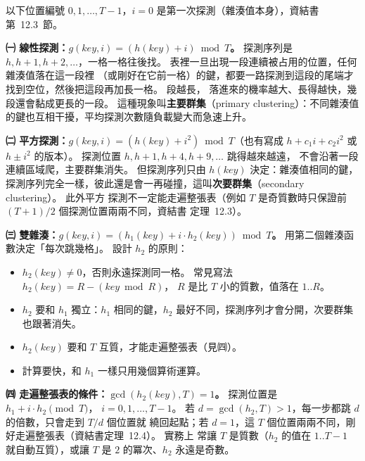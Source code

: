 \begin{pastsoln}
以下位置編號 $0, 1, \dots, T-1$，$i = 0$ 是第一次探測（雜湊值本身），資結書第~12.3~節。

\textbf{㈠ 線性探測：$g(\mathit{key}, i) = (h(\mathit{key}) + i) \bmod T$。} 探測序列是
$h, h+1, h+2, \dots$，一格一格往後找。 表裡一旦出現一段連續被占用的位置，任何雜湊值落在這一段裡
（或剛好在它前一格）的鍵，都要一路探測到這段的尾端才找到空位，然後把這段再加長一格。 段越長，
落進來的機率越大、長得越快，幾段還會黏成更長的一段。 這種現象叫\textbf{主要群集}（primary
clustering）：不同雜湊值的鍵也互相干擾，平均探測次數隨負載變大而急速上升。

\textbf{㈡ 平方探測：$g(\mathit{key}, i) = (h(\mathit{key}) + i^2) \bmod T$}（也有寫成
$h + c_1 i + c_2 i^2$ 或 $h \pm i^2$ 的版本）。 探測位置 $h, h+1, h+4, h+9, \dots$ 跳得越來越遠，
不會沿著一段連續區域爬，主要群集消失。 但探測序列只由 $h(\mathit{key})$ 決定：雜湊值相同的鍵，
探測序列完全一樣，彼此還是會一再碰撞，這叫\textbf{次要群集}（secondary clustering）。 此外平方
探測不一定能走遍整張表（例如 $T$ 是奇質數時只保證前 $(T+1)/2$ 個探測位置兩兩不同，資結書
定理~12.3）。

\textbf{㈢ 雙雜湊：$g(\mathit{key}, i) = (h_1(\mathit{key}) + i \cdot h_2(\mathit{key})) \bmod T$。}
用第二個雜湊函數決定「每次跳幾格」。 設計 $h_2$ 的原則：
\begin{itemize}
\item $h_2(\mathit{key}) \ne 0$，否則永遠探測同一格。 常見寫法 $h_2(\mathit{key}) = R - (\mathit{key} \bmod R)$，
$R$ 是比 $T$ 小的質數，值落在 $1..R$。
\item $h_2$ 要和 $h_1$ 獨立：$h_1$ 相同的鍵，$h_2$ 最好不同，探測序列才會分開，次要群集也跟著消失。
\item $h_2(\mathit{key})$ 要和 $T$ 互質，才能走遍整張表（見㈣）。
\item 計算要快，和 $h_1$ 一樣只用幾個算術運算。
\end{itemize}

\textbf{㈣ 走遍整張表的條件：$\gcd(h_2(\mathit{key}), T) = 1$。} 探測位置是 $h_1 + i \cdot h_2 \pmod T$，
$i = 0, 1, \dots, T-1$。 若 $d = \gcd(h_2, T) > 1$，每一步都跳 $d$ 的倍數，只會走到 $T/d$ 個位置就
繞回起點；若 $d = 1$，這 $T$ 個位置兩兩不同，剛好走遍整張表（資結書定理~12.4）。 實務上
常讓 $T$ 是質數（$h_2$ 的值在 $1..T-1$ 就自動互質），或讓 $T$ 是 $2$ 的冪次、$h_2$ 永遠是奇數。


\end{pastsoln}
